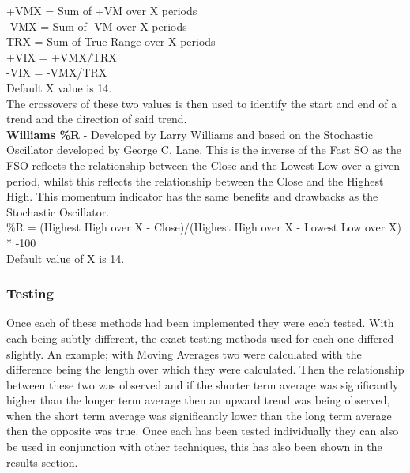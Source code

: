 \documentclass[12pt,a4paper]{article}
\begin{document}
\noindent
+VMX = Sum of +VM over X periods \\
-VMX = Sum of -VM over X periods \\

\noindent
TRX = Sum of True Range over X periods \\

\noindent
+VIX = +VMX/TRX \\
-VIX = -VMX/TRX \\

\noindent
Default X value is 14.\\

\noindent
The crossovers of these two values is then used to identify the start and end of a trend and the direction of said trend.\\

\iffalse
[]
\fi

\noindent
\textbf{Williams \%R} - Developed by Larry Williams and based on the Stochastic Oscillator developed by George C. Lane. This is the inverse of the Fast SO as the FSO reflects the relationship between the Close and the Lowest Low over a given period, whilst this reflects the relationship between the Close and the Highest High. This momentum indicator has the same benefits and drawbacks as the Stochastic Oscillator.\\

\noindent
\%R = (Highest High over X - Close)/(Highest High over X - Lowest Low over X) * -100\\
Default value of X is 14.

\iffalse
[]
\fi

\iffalse
#################################################################################
\fi

\subsubsection*{Testing}

Once each of these methods had been implemented they were each tested. With each being subtly different, the exact testing methods used for each one differed slightly. An example; with Moving Averages two were calculated with the difference being the length over which they were calculated. Then the relationship between these two was observed and if the shorter term average was significantly higher than the longer term average then an upward trend was being observed, when the short term average was significantly lower than the long term average then the opposite was true. Once each has been tested individually they can also be used in conjunction with other techniques, this has also been shown in the results section. \\
\end{document}
